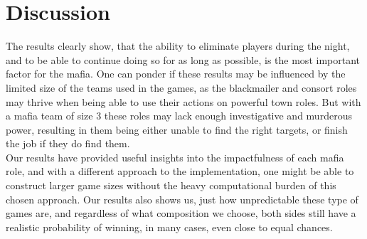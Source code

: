 \section{Discussion}\label{sec:discussion}
The results clearly show, that the ability to eliminate players during the
night, and to be able to continue doing so for as long as possible, is the most
important factor for the mafia. One can ponder if these results may be
influenced by the limited size of the teams used in the games, as the
blackmailer and consort roles may thrive when being able to use their actions
on powerful town roles. But with a mafia team of size 3 these roles may lack
enough investigative and murderous power, resulting in them being either unable
to find the right targets, or finish the job if they do find them.\\ Our
results have provided useful insights into the impactfulness of each mafia
role, and with a different approach to the implementation, one might be able to
construct larger game sizes without the heavy computational burden of this
chosen approach. Our results also shows us, just how unpredictable these type
of games are, and regardless of what composition we choose, both sides still
have a realistic probability of winning, in many cases, even close to equal
chances.
